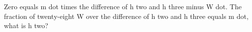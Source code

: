 Zero equals m dot times the difference of h two and h three minus W dot. The fraction of twenty-eight W over the difference of h two and h three equals m dot, what is h two?